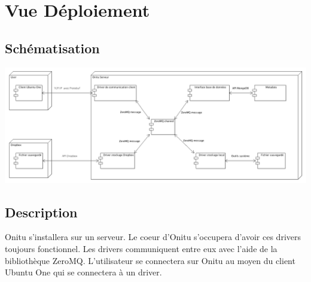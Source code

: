 \chapter{Vue Déploiement}
\thispagestyle{EIP}

\section{Schématisation}
\includegraphics[scale= 0.3]{deployment.png} 

\section{Description}

Onitu s'installera sur un serveur. Le coeur d'Onitu s'occupera d'avoir ces drivers toujours fonctionnel. Les drivers communiquent entre eux avec l'aide de la bibliothèque ZeroMQ. L'utilisateur se connectera sur Onitu au moyen du client Ubuntu One qui se connectera à un driver.
